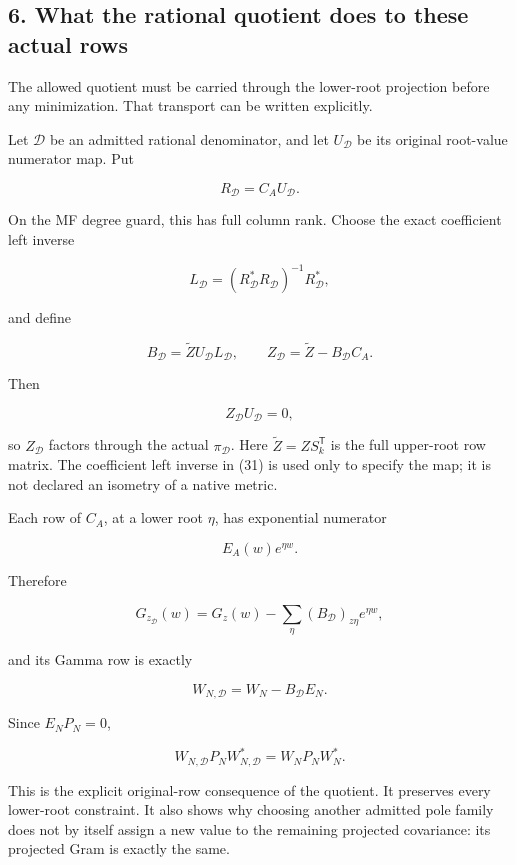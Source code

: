\documentclass[11pt]{article}
\begin{document}
\subsection{6. What the rational quotient does to these actual rows}\label{what-the-rational-quotient-does-to-these-actual-rows}

The allowed quotient must be carried through the lower-root projection before any minimization. That transport can be written explicitly.

Let \(\mathcal D\) be an admitted rational denominator, and let \(U_{\mathcal D}\) be its original root-value numerator map. Put

\[
R_{\mathcal D}=C_AU_{\mathcal D}.
\]

On the MF degree guard, this has full column rank. Choose the exact coefficient left inverse

\[
L_{\mathcal D}
=
(R_{\mathcal D}^*R_{\mathcal D})^{-1}R_{\mathcal D}^*,
\]

and define

\[
B_{\mathcal D}
=
\widetilde ZU_{\mathcal D}L_{\mathcal D},
\qquad
Z_{\mathcal D}=\widetilde Z-B_{\mathcal D}C_A.
\tag{31}
\]

Then

\[
Z_{\mathcal D}U_{\mathcal D}=0,
\]

so \(Z_{\mathcal D}\) factors through the actual \(\pi_{\mathcal D}\). Here \(\widetilde Z=ZS_k^{\mathsf T}\) is the full upper-root row matrix. The coefficient left inverse in (31) is used only to specify the map; it is not declared an isometry of a native metric.

Each row of \(C_A\), at a lower root \(\eta\), has exponential numerator

\[
E_A(w)e^{\eta w}.
\]

Therefore

\[
G_{z_{\mathcal D}}(w)
=
G_z(w)-\sum_\eta(B_{\mathcal D})_{z\eta}e^{\eta w},
\]

and its Gamma row is exactly

\[
\boxed{
W_{N,\mathcal D}=W_N-B_{\mathcal D}E_N.
}
\tag{32}
\]

Since \(E_NP_N=0\),

\[
\boxed{
W_{N,\mathcal D}P_NW_{N,\mathcal D}^*
=
W_NP_NW_N^*.
}
\tag{33}
\]

This is the explicit original-row consequence of the quotient. It preserves every lower-root constraint. It also shows why choosing another admitted pole family does not by itself assign a new value to the remaining projected covariance: its projected Gram is exactly the same.
\end{document}
